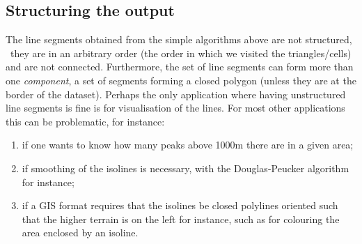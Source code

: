 





\subsection{Structuring the output}%
\label{sec:structuring}

The line segments obtained from the simple algorithms above are not structured, \ie\ they are in an arbitrary order (the order in which we visited the triangles/cells) and are not connected.
Furthermore, the set of line segments can form more than one \emph{component}, a set of segments forming a closed polygon (unless they are at the border of the dataset).
Perhaps the only application where having unstructured line segments is fine is for visualisation of the lines.
For most other applications this can be problematic, for instance:
\begin{enumerate}
  \item if one wants to know how many peaks above 1000m there are in a given area;
  \item if smoothing of the isolines is necessary, with the Douglas-Peucker algorithm for instance;
  \item if a GIS format requires that the isolines be closed polylines oriented such that the higher terrain is on the left for instance, such as for colouring the area enclosed by an isoline.
\end{enumerate}


